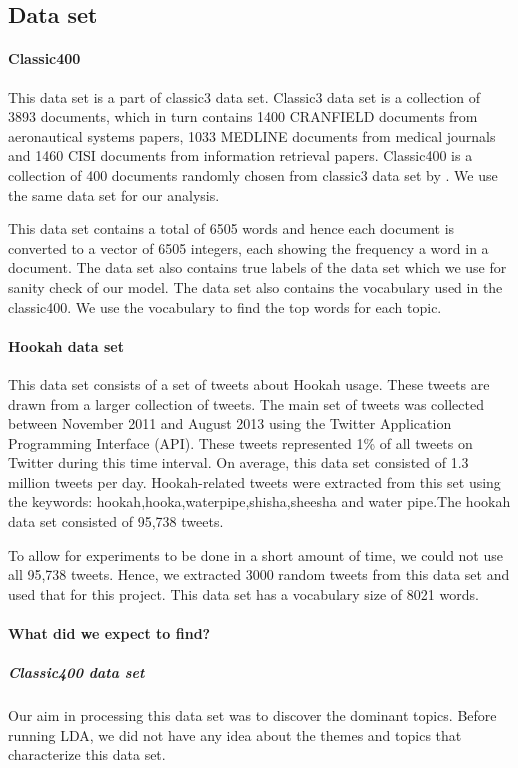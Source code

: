 \documentclass[11pt,a4paper,oneside]{article}
\begin{document}
\subsection{Data set}

\paragraph{Classic400}

This data set is a part of classic3\cite{banerjee2005clustering} data set. Classic3 data set is a collection of 3893 documents, which in turn contains 1400 CRANFIELD documents from aeronautical systems papers, 1033 MEDLINE documents from medical journals and 1460 CISI documents from information retrieval papers. Classic400 is a collection of 400 documents randomly chosen from classic3 data set by \cite{banerjee2005clustering}. We use the same data set for our analysis.

This data set contains a total of 6505 words and hence each document is converted to a vector of 6505 integers, each showing the frequency a word in a document. The data set also contains true labels of the data set which we use for sanity check of our model. The data set also contains the vocabulary used in the classic400. We use the vocabulary to find the top words for each topic.

\paragraph{Hookah data set}
This data set consists of a set of tweets about Hookah usage. These tweets are drawn from a larger collection of tweets. The main set of tweets was collected between November 2011 and August 2013 using the Twitter Application Programming Interface (API). These tweets represented 1\% of all tweets on Twitter during this time interval. On average, this data set consisted of 1.3 million tweets per day. Hookah-related tweets were extracted from this set using the keywords: hookah,hooka,waterpipe,shisha,sheesha and water pipe.The hookah data set consisted of 95,738 tweets. 

To allow for experiments to be done in a short amount of time, we could not use all 95,738 tweets. Hence, we extracted 3000 random tweets from this data set and used that for this project. This data set has a vocabulary size of 8021 words.

\paragraph{What did we expect to find?}
\subparagraph{Classic400 data set}
Our aim in processing this data set was to discover the dominant topics. Before running LDA, we did not have any idea about the themes and topics that characterize this data set. 
\end{document}

